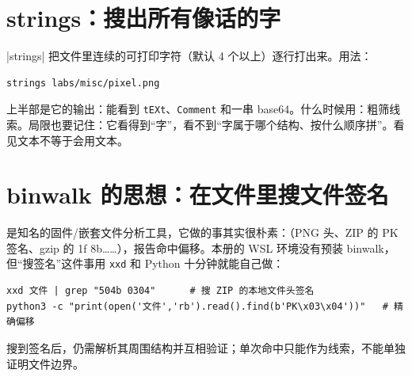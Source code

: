 \documentclass[UTF8,12pt,oneside]{ctexbook}
\begin{document}
\section{strings：搜出所有像话的字}
\kw|strings| 把文件里连续的可打印字符（默认 4 个以上）逐行打出来。用法：
\begin{lstlisting}
strings labs/misc/pixel.png
\end{lstlisting}
 上半部是它的输出：能看到 \verb|tEXt|、\verb|Comment| 和一串 base64。什么时候用：粗筛线索。局限也要记住：它看得到“字”，看不到“字属于哪个结构、按什么顺序拼”。看见文本不等于会用文本。

\section{binwalk 的思想：在文件里搜文件签名}
 是知名的固件/嵌套文件分析工具，它做的事其实很朴素：（PNG 头、ZIP 的 PK 签名、gzip 的 1f 8b……），报告命中偏移。本册的 WSL 环境没有预装 binwalk，但“搜签名”这件事用 \verb|xxd| 和 Python 十分钟就能自己做：
\begin{lstlisting}
xxd 文件 | grep "504b 0304"      # 搜 ZIP 的本地文件头签名
python3 -c "print(open('文件','rb').read().find(b'PK\x03\x04'))"   # 精确偏移
\end{lstlisting}
搜到签名后，仍需解析其周围结构并互相验证；单次命中只能作为线索，不能单独证明文件边界。
\end{document}
